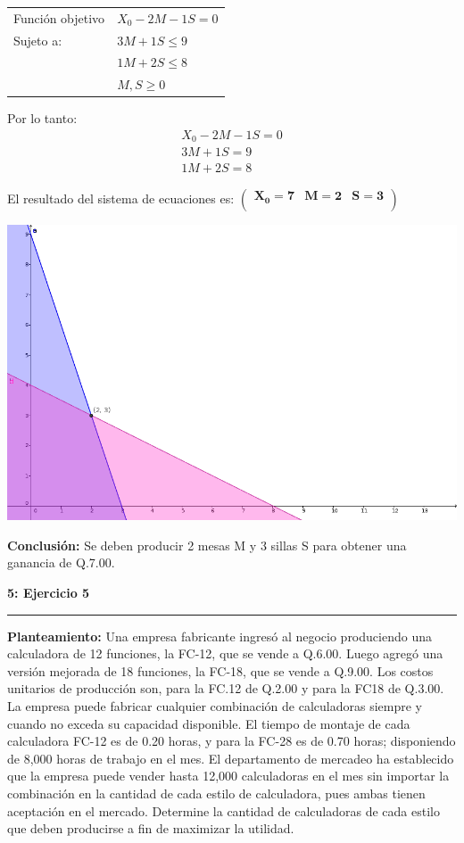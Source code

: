 \documentclass[11pt]{article}
\newcommand\problema[2]{\vspace{.01in}\textbf{#1: #2}\vspace{.5em}\hrule\vspace{.10in}}
\newcommand\planteamiento{\vspace{.10in}\textbf{Planteamiento: }}
\newcommand\conclusion{\vspace{.10in}\textbf{Conclusión: }}
\begin{document}
\begin{table}[h]
\begin{tabular}{ll}
Función objetivo & $X_0-2M-1S=0$    \\
Sujeto a:        & $3M+1S \leq 9$ \\
                 & $1M+2S \leq 8$ \\
                 & $M,S \geq 0$    
\end{tabular}
\end{table}

Por lo tanto:
\begin{align*}
X_0-2M-1S=0\\
3M+1S=9\\
1M+2S=8
\end{align*}

El resultado del sistema de ecuaciones es:
\begin{math}
\mathbf{\left(\begin{array}{rrr}X_0=7&M=2&S=3\\\end{array}\right)}
\end{math}

\begin{center}
\includegraphics[scale=0.5]{parcial1src/problema3.png}
\end{center}
\conclusion Se deben producir 2 mesas M y 3 sillas S para obtener una ganancia de Q.7.00.
\pagebreak


\problema{5}{Ejercicio 5}
\planteamiento
Una empresa fabricante ingresó al negocio produciendo una calculadora de 12 funciones, la FC-12, que se vende a Q.6.00. Luego agregó una versión mejorada de 18 funciones, la FC-18, que se vende a Q.9.00. Los costos unitarios de producción son, para la FC.12 de Q.2.00 y para la FC18 de Q.3.00. La empresa puede fabricar cualquier combinación de calculadoras siempre y cuando no exceda su capacidad disponible. El tiempo de montaje de cada calculadora FC-12 es de 0.20 horas, y para la FC-28 es de 0.70 horas; disponiendo de 8,000 horas de trabajo en el mes. El departamento de mercadeo ha establecido que la empresa puede vender hasta 12,000 calculadoras en el mes sin importar la combinación en la cantidad de cada estilo de calculadora, pues ambas tienen aceptación en el mercado. Determine la cantidad de calculadoras de cada estilo que deben producirse a fin de maximizar la utilidad.
\end{document}
